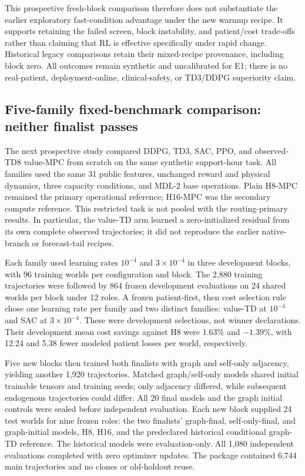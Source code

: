 \documentclass[preprint,review,12pt]{elsarticle}
\begin{document}
This prospective fresh-block comparison therefore does not substantiate the
earlier exploratory fast-condition advantage under the new warmup recipe.
It supports retaining the failed screen, block instability, and patient/cost
trade-offs rather than claiming that RL is effective specifically under rapid
change. Historical legacy comparisons retain their mixed-recipe provenance,
including block zero. All outcomes remain synthetic and uncalibrated for E1;
there is no real-patient, deployment-online, clinical-safety, or TD3/DDPG
superiority claim.

\subsection{Five-family fixed-benchmark comparison: neither finalist passes}
\label{sec:family-selection-development}
The next prospective study compared DDPG, TD3, SAC, PPO, and observed-TD8
value-MPC from scratch on the same synthetic support-hour task. All families
used the same 31 public features, unchanged reward and physical dynamics,
three capacity conditions, and MDL-2 base operations. Plain H8-MPC remained
the primary operational reference; H16-MPC was the secondary compute reference.
This restricted task is not pooled with the routing-primary results.
In particular, the value-TD arm learned a zero-initialized residual from its
own complete observed trajectories; it did not reproduce the earlier
native-branch or forecast-tail recipes.

Each family used learning rates $10^{-4}$ and $3\times10^{-4}$ in three
development blocks, with 96 training worlds per configuration and block.
The 2,880 training trajectories were followed by 864 frozen development
evaluations on 24 shared worlds per block under 12 roles. A frozen
patient-first, then cost selection rule chose one learning rate per family
and two distinct families: value-TD at $10^{-4}$ and SAC at
$3\times10^{-4}$. These were development selections, not winner declarations.
Their development mean cost savings against H8 were 1.63\% and $-1.39\%$,
with 12.24 and 5.38 fewer modeled patient losses per world, respectively.

Five new blocks then trained both finalists with graph and self-only
adjacency, yielding another 1,920 trajectories. Matched graph/self-only
models shared initial trainable tensors and training seeds; only adjacency
differed, while subsequent endogenous trajectories could differ. All 20
final models and the graph initial controls were sealed before independent
evaluation. Each new block supplied 24 test worlds for nine frozen roles:
the two finalists' graph-final, self-only-final, and graph-initial models,
H8, H16, and the predeclared historical conditional graph-TD reference.
The historical models were evaluation-only. All 1,080 independent evaluations
completed with zero optimizer updates. The package contained 6,744 main
trajectories and no clones or old-holdout reuse.
\end{document}
